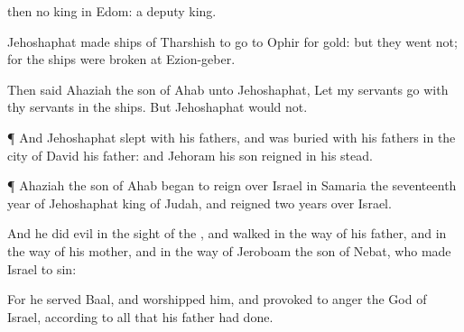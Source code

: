 { then no
king in
Edom: a
deputy
{}
king.

Jehoshaphat
made
ships of
Tharshish to
go to
Ophir for
gold: but they
went not; for the
ships were
broken at
Ezion-geber.

Then
said
Ahaziah the
son of
Ahab unto
Jehoshaphat, Let my
servants
go with thy
servants in the
ships. But
Jehoshaphat
would not.


\par }{\PP {}¶ And
Jehoshaphat
slept with his
fathers, and was
buried with his
fathers in the
city of
David his
father: and
Jehoram his
son
reigned in his stead.


\par }{\PP {}¶
Ahaziah the
son of
Ahab began to
reign over
Israel in
Samaria the
seventeenth
year of
Jehoshaphat
king of
Judah, and
reigned two
years over
Israel.

And he
did
evil in the
sight of the
{}, and
walked in the
way of his
father, and in the
way of his
mother, and in the
way of
Jeroboam the
son of
Nebat, who made
Israel to
sin:

For he
served
Baal, and
worshipped him, and provoked to
anger the
{}
God of
Israel, according to all that his
father had
done.


\par }